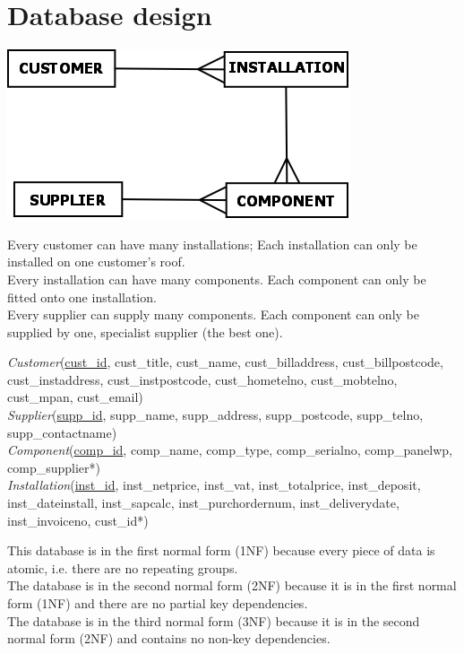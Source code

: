 	\section{Database design}
\begin{center}\includegraphics[scale=0.45]{erd_new}\end{center}
	
Every customer can have many installations; Each installation can only be
installed on one customer's roof.\\
Every installation can have many components. Each component can only be
fitted onto one installation.\\
Every supplier can supply many components.  Each component can only be
supplied by one, specialist supplier (the best one).

	\textit{Customer}(\underline{cust\_id}, cust\_title, cust\_name, cust\_billaddress, cust\_billpostcode, cust\_instaddress, cust\_instpostcode, cust\_hometelno, cust\_mobtelno, cust\_mpan, cust\_email)\\
	\textit{Supplier}(\underline{supp\_id}, supp\_name, supp\_address, supp\_postcode, supp\_telno, supp\_contactname)\\
	\textit{Component}(\underline{comp\_id}, comp\_name, comp\_type, comp\_serialno, comp\_panelwp, comp\_supplier*)\\
	\textit{Installation}(\underline{inst\_id}, inst\_netprice, inst\_vat, inst\_totalprice, inst\_deposit, inst\_dateinstall, inst\_sapcalc, inst\_purchordernum, inst\_deliverydate, inst\_invoiceno, cust\_id*)

	This database is in the first normal form (1NF) because every piece of data is atomic, i.e. there are no repeating groups.\\
	The database is in the second normal form (2NF) because it is in the first normal form (1NF) and there are no partial key dependencies.\\
	The database is in the third normal form (3NF) because it is in the second normal form (2NF) and contains no non-key dependencies.
